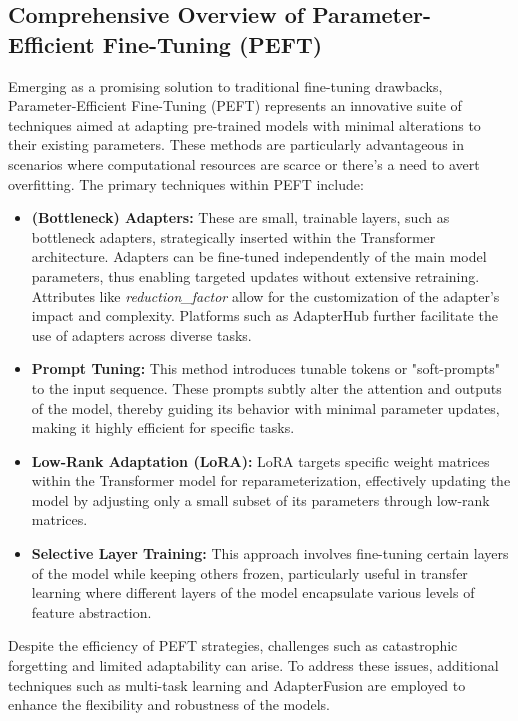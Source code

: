 \documentclass[12pt]{article}
\begin{document}
\subsection{Comprehensive Overview of Parameter-Efficient Fine-Tuning (PEFT)}

Emerging as a promising solution to traditional fine-tuning drawbacks, Parameter-Efficient Fine-Tuning (PEFT) represents an innovative suite of techniques aimed at adapting pre-trained models with minimal alterations to their existing parameters. These methods are particularly advantageous in scenarios where computational resources are scarce or there's a need to avert overfitting. The primary techniques within PEFT include:

\begin{itemize}
    \item \textbf{(Bottleneck) Adapters:} These are small, trainable layers, such as bottleneck adapters, strategically inserted within the Transformer architecture. Adapters can be fine-tuned independently of the main model parameters, thus enabling targeted updates without extensive retraining. Attributes like \textit{reduction\_factor} allow for the customization of the adapter's impact and complexity. Platforms such as AdapterHub further facilitate the use of adapters across diverse tasks.
    
    \item \textbf{Prompt Tuning:} This method introduces tunable tokens or "soft-prompts" to the input sequence. These prompts subtly alter the attention and outputs of the model, thereby guiding its behavior with minimal parameter updates, making it highly efficient for specific tasks.
    
    \item \textbf{Low-Rank Adaptation (LoRA):} LoRA targets specific weight matrices within the Transformer model for reparameterization, effectively updating the model by adjusting only a small subset of its parameters through low-rank matrices.
    
    \item \textbf{Selective Layer Training:} This approach involves fine-tuning certain layers of the model while keeping others frozen, particularly useful in transfer learning where different layers of the model encapsulate various levels of feature abstraction.
\end{itemize}

Despite the efficiency of PEFT strategies, challenges such as catastrophic forgetting and limited adaptability can arise. To address these issues, additional techniques such as multi-task learning and AdapterFusion are employed to enhance the flexibility and robustness of the models.
\end{document}
